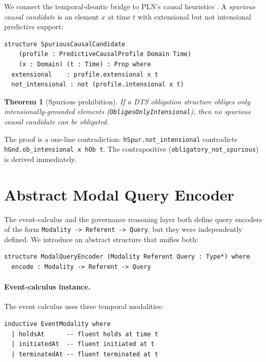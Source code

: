\documentclass[]{article}
\newtheorem{theorem}{Theorem}
\newcommand{\code}[1]{\texttt{#1}}
\newcommand{\DTS}{\textup{DTS}}
\newcommand{\PLN}{\textup{PLN}}
\begin{document}
We connect the temporal-deontic bridge to \PLN{}'s causal heuristics
\cite{goertzel2009pln}.
A \emph{spurious causal candidate} is an element $x$ at time $t$ with
extensional but not intensional predictive support:

\begin{lstlisting}
structure SpuriousCausalCandidate
    (profile : PredictiveCausalProfile Domain Time)
    (x : Domain) (t : Time) : Prop where
  extensional    : profile.extensional x t
  not_intensional : not (profile.intensional x t)
\end{lstlisting}

\begin{theorem}[Spurious prohibition]
If a \DTS{} obligation structure obliges only intensionally-grounded elements
(\code{ObligesOnlyIntensional}), then no spurious causal candidate can be
obligated.
\end{theorem}

\noindent
The proof is a one-line contradiction: \code{hSpur.not\_intensional}
contradicts \code{hGnd.ob\_intensional x hOb t}.
The contrapositive (\code{obligatory\_not\_spurious}) is derived immediately.

\section{Abstract Modal Query Encoder}
\label{sec:mqe}

The event-calculus \cite{KowalskiSergot1986,Shanahan1999} and the governance
reasoning layer both define query encoders of the form
\code{Modality -> Referent -> Query}, but they were independently defined.
We introduce an abstract structure that unifies both:

\begin{lstlisting}
structure ModalQueryEncoder (Modality Referent Query : Type*) where
  encode : Modality -> Referent -> Query
\end{lstlisting}

\paragraph{Event-calculus instance.}
The event calculus uses three temporal modalities:

\begin{lstlisting}
inductive EventModality where
  | holdsAt      -- fluent holds at time t
  | initiatedAt  -- fluent initiated at t
  | terminatedAt -- fluent terminated at t
\end{lstlisting}
\end{document}
